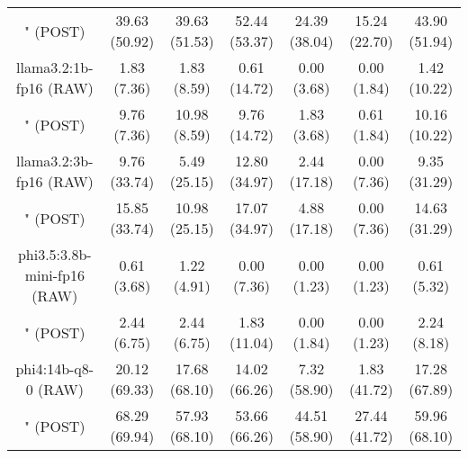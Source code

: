 \begin{table}[]
{\begin{tabular}{ccccccc}
        

        \multicolumn{1}{c|}{" (POST)} & 39.63 (50.92) & 39.63 (51.53) & \multicolumn{1}{c|}{52.44 (53.37)} & 24.39 (38.04) & \multicolumn{1}{c|}{15.24 (22.70)} & 43.90 (51.94) \\
        \cline{1-7}
        

        \multicolumn{1}{c|}{llama3.2:1b-fp16 (RAW)} & 1.83 (7.36) & 1.83 (8.59) & \multicolumn{1}{c|}{0.61 (14.72)} & 0.00 (3.68) & \multicolumn{1}{c|}{0.00 (1.84)} & 1.42 (10.22) \\
        
        

        \multicolumn{1}{c|}{" (POST)} & 9.76 (7.36) & 10.98 (8.59) & \multicolumn{1}{c|}{9.76 (14.72)} & 1.83 (3.68) & \multicolumn{1}{c|}{0.61 (1.84)} & 10.16 (10.22) \\
        \cline{1-7}
        

        \multicolumn{1}{c|}{llama3.2:3b-fp16 (RAW)} & 9.76 (33.74) & 5.49 (25.15) & \multicolumn{1}{c|}{12.80 (34.97)} & 2.44 (17.18) & \multicolumn{1}{c|}{0.00 (7.36)} & 9.35 (31.29) \\
        
        

        \multicolumn{1}{c|}{" (POST)} & 15.85 (33.74) & 10.98 (25.15) & \multicolumn{1}{c|}{17.07 (34.97)} & 4.88 (17.18) & \multicolumn{1}{c|}{0.00 (7.36)} & 14.63 (31.29) \\
        \cline{1-7}
        

        \multicolumn{1}{c|}{phi3.5:3.8b-mini-fp16 (RAW)} & 0.61 (3.68) & 1.22 (4.91) & \multicolumn{1}{c|}{0.00 (7.36)} & 0.00 (1.23) & \multicolumn{1}{c|}{0.00 (1.23)} & 0.61 (5.32) \\
        
        

        \multicolumn{1}{c|}{" (POST)} & 2.44 (6.75) & 2.44 (6.75) & \multicolumn{1}{c|}{1.83 (11.04)} & 0.00 (1.84) & \multicolumn{1}{c|}{0.00 (1.23)} & 2.24 (8.18) \\
        \cline{1-7}
        

        \multicolumn{1}{c|}{phi4:14b-q8-0 (RAW)} & 20.12 (69.33) & 17.68 (68.10) & \multicolumn{1}{c|}{14.02 (66.26)} & 7.32 (58.90) & \multicolumn{1}{c|}{1.83 (41.72)} & 17.28 (67.89) \\
        
        

        \multicolumn{1}{c|}{" (POST)} & 68.29 (69.94) & 57.93 (68.10) & \multicolumn{1}{c|}{53.66 (66.26)} & 44.51 (58.90) & \multicolumn{1}{c|}{27.44 (41.72)} & 59.96 (68.10) \\
        \cline{1-7}
        


\end{tabular}}
\end{table}
